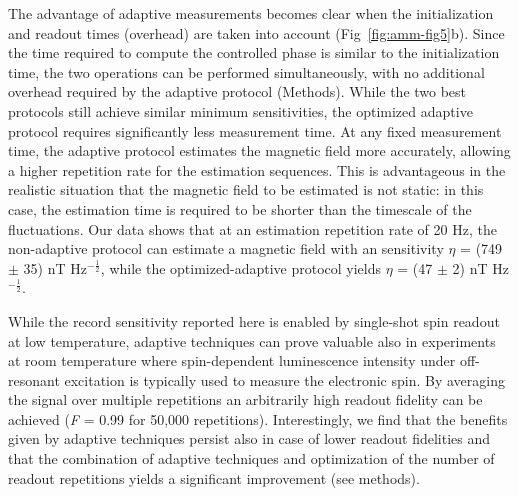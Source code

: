 The advantage of adaptive measurements becomes clear when the initialization and readout times (overhead) are taken into account (Fig \,\ref{fig:amm-fig5}b). Since the time required to compute the controlled phase is similar to the initialization time, the two operations can be performed simultaneously, with no additional overhead required by the adaptive protocol (Methods). While the two best protocols still achieve similar minimum sensitivities, the optimized adaptive protocol requires significantly less measurement time. At any fixed measurement time, the adaptive protocol estimates the magnetic field more accurately, allowing a higher repetition rate for the estimation sequences. This is advantageous in the realistic situation that the magnetic field to be estimated is not static: in this case, the estimation time is required to be shorter than the timescale of the fluctuations. Our data shows that at an estimation repetition rate of 20 Hz, the non-adaptive protocol can estimate a magnetic field with an sensitivity $\eta$ = (749 $\pm$ 35) nT Hz$^{-\frac{1}{2}}$, while the optimized-adaptive protocol yields $\eta$ = (47 $\pm$ 2) nT Hz$^{-\frac{1}{2}}$.

While the record sensitivity reported here is enabled by single-shot spin readout at low temperature, adaptive techniques can prove valuable also in experiments at room temperature\cite{Nusran_NatNano_2012} where spin-dependent luminescence intensity under off-resonant excitation is typically used to measure the electronic spin. By averaging the signal over multiple repetitions an arbitrarily high readout fidelity can be achieved (\textit{F} = 0.99 for 50,000 repetitions\cite{Nusran_NatNano_2012}). Interestingly, we find that the benefits given by adaptive techniques persist also in case of lower readout fidelities and that the combination of adaptive techniques and optimization of the number of readout repetitions yields a significant improvement (see methods).

